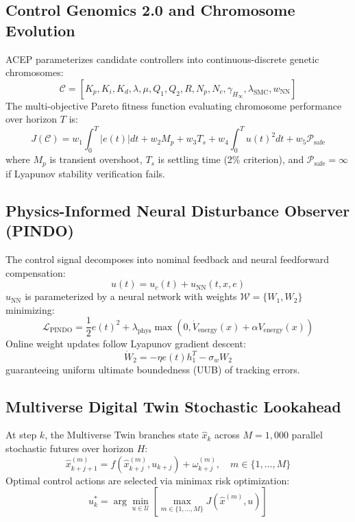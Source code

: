 \documentclass[journal,twocolumn]{IEEEtran}
\begin{document}
\subsection{Control Genomics 2.0 and Chromosome Evolution}
ACEP parameterizes candidate controllers into continuous-discrete genetic chromosomes:
\begin{equation}
    \mathcal{C} = \left[ K_p, K_i, K_d, \lambda, \mu, Q_1, Q_2, R, N_p, N_c, \gamma_{H_\infty}, \lambda_{\text{SMC}}, w_{\text{NN}} \right]
    \label{eq:chromosome}
\end{equation}
The multi-objective Pareto fitness function evaluating chromosome performance over horizon $T$ is:
\begin{equation}
    J(\mathcal{C}) = w_1 \int_0^T |e(t)| dt + w_2 M_p + w_3 T_s + w_4 \int_0^T u(t)^2 dt + w_5 \mathcal{P}_{\text{safe}}
    \label{eq:fitness}
\end{equation}
where $M_p$ is transient overshoot, $T_s$ is settling time (2\% criterion), and $\mathcal{P}_{\text{safe}} = \infty$ if Lyapunov stability verification fails.

\subsection{Physics-Informed Neural Disturbance Observer (PINDO)}
The control signal decomposes into nominal feedback and neural feedforward compensation:
\begin{equation}
    u(t) = u_c(t) + u_{\text{NN}}(t, x, e)
    \label{eq:u_decomp}
\end{equation}
$u_{\text{NN}}$ is parameterized by a neural network with weights $\mathcal{W} = \{W_1, W_2\}$ minimizing:
\begin{equation}
    \mathcal{L}_{\text{PINDO}} = \frac{1}{2} e(t)^2 + \lambda_{\text{phys}} \max\left(0, \dot{V}_{\text{energy}}(x) + \alpha V_{\text{energy}}(x)\right)
    \label{eq:pindo_loss}
\end{equation}
Online weight updates follow Lyapunov gradient descent:
\begin{equation}
    \dot{W}_2 = -\eta e(t) h_1^T - \sigma_w W_2
    \label{eq:w2_update}
\end{equation}
guaranteeing uniform ultimate boundedness (UUB) of tracking errors.

\subsection{Multiverse Digital Twin Stochastic Lookahead}
At step $k$, the Multiverse Twin branches state $\hat{x}_k$ across $M = 1,000$ parallel stochastic futures over horizon $H$:
\begin{equation}
    \hat{x}_{k+j+1}^{(m)} = f\left(\hat{x}_{k+j}^{(m)}, u_{k+j}\right) + \omega_{k+j}^{(m)}, \quad m \in \{1, \dots, M\}
    \label{eq:multiverse}
\end{equation}
Optimal control actions are selected via minimax risk optimization:
\begin{equation}
    u_k^* = \arg\min_{u \in \mathcal{U}} \left[ \max_{m \in \{1, \dots, M\}} J\left(\hat{x}^{(m)}, u\right) \right]
    \label{eq:minimax}
\end{equation}
\end{document}
